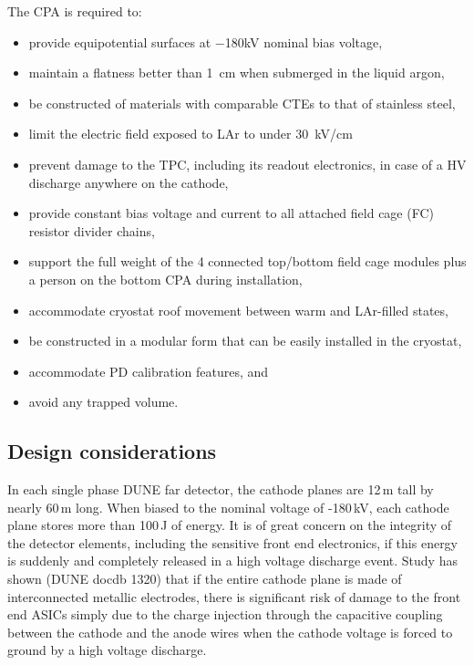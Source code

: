 The CPA is required to:
\begin{itemize}
\item provide equipotential surfaces at $-$180kV nominal bias voltage,
\item maintain a flatness better than 1~cm when submerged in the liquid argon,
\item be constructed of materials with comparable CTEs to that of stainless steel, 
\item limit the electric field exposed to LAr to under 30~kV/cm 
\item prevent damage to the TPC, including its readout electronics, in case of a HV discharge anywhere on the cathode,
\item provide constant bias voltage and current to all attached field cage (FC) resistor divider chains,
\item support the full weight of the 4 connected top/bottom field cage modules plus a person on the bottom CPA during installation,
\item accommodate cryostat roof movement between warm and LAr-filled states,
\item be constructed in a modular form that can be easily installed in the cryostat,
\item accommodate PD calibration features, and
\item avoid any trapped volume.
\end{itemize}

\subsection{Design considerations}

In each single phase DUNE far detector, the cathode planes are 12\,m tall by nearly 60\,m long.  When biased to the nominal voltage of -180\,kV, each cathode plane stores more than 100\,J of energy. It is of great concern on the integrity of the detector elements, including the sensitive front end electronics, if this energy is suddenly and completely released in a high voltage discharge event.  Study has shown (DUNE docdb 1320)  that if the entire cathode plane is made of interconnected metallic electrodes, there is significant risk of damage to the front end ASICs simply due to the charge injection through the capacitive coupling between the cathode and the anode wires when the cathode voltage is forced to ground by a high voltage discharge.  

